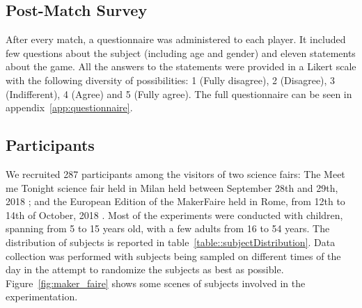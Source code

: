 \subsection{Post-Match Survey}

After every match, a questionnaire was administered to each player. It included few questions about the subject (including age and gender) and eleven statements about the game. All the answers to the statements were provided in a Likert scale with the following diversity of possibilities: 1 (Fully disagree), 2 (Disagree), 3 (Indifferent), 4 (Agree) and 5 (Fully agree). The full questionnaire can be seen in appendix~\ref{app:questionnaire}. 

\subsection{Participants}
We recruited 287 participants among the visitors of two science fairs: The Meet me Tonight science fair held in Milan held between September 28th and 29th, 2018%
; and the European Edition of the MakerFaire held in Rome, from 12th to 14th of October, 2018%
. Most of the experiments were conducted with children, spanning from 5 to 15 years old, with a few adults from 16 to 54 years. The distribution of subjects is reported in table~\ref{table::subjectDistribution}. Data collection was performed with subjects being sampled on different times of the day in the attempt to randomize the subjects as best as possible. Figure~\ref{fig:maker_faire} shows some scenes of subjects involved in the experimentation.

